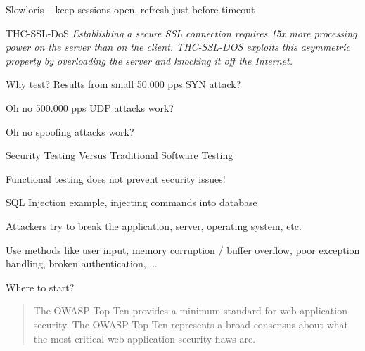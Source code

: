 \documentclass[Screen16to9,17pt]{foils}
\begin{document}
\begin{list2}
\item Slowloris -- keep sessions open, refresh just before timeout\\
\item THC-SSL-DoS
\emph{Establishing a secure SSL connection requires 15x more processing power on the server than on the client. THC-SSL-DOS exploits this asymmetric property by overloading the server and knocking it off the Internet.}
\end{list2}



\centerline{Why test? Results from small 50.000 pps SYN attack?}



\centerline{Oh no 500.000 pps UDP attacks work?}



\centerline{Oh no spoofing attacks work?}







\begin{list2}
\item Security Testing Versus Traditional Software Testing
\item Functional testing does not prevent security issues!
\item SQL Injection example, injecting commands into database
\item Attackers try to break the application, server, operating system, etc.
\item Use methods like user input, memory corruption / buffer overflow, poor exception handling, broken authentication, ...
\end{list2}

\vskip 2cm
\centerline{\LARGE Where to start?}



\begin{quote}
The OWASP Top Ten provides a minimum standard for web application
security. The OWASP Top Ten represents a broad consensus about what
the most critical web application security flaws are.
\end{quote}
\end{document}
